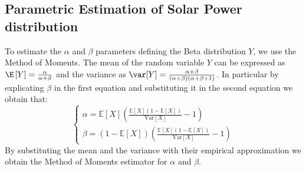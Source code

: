 {%



\subsection{Parametric Estimation of Solar Power distribution}\label{subsection: beta estim}

To estimate the \(\alpha\) and \(\beta\) parameters defining the Beta distribution \(Y\), we use the Method of Moments.
The mean of the random variable \(Y\) can be expressed as \(\E\left[ Y\right] = \frac{\alpha}{\alpha + \beta} \) and the variance as \(\var [Y]= \frac{\alpha + \beta}{(\alpha + \beta)(\alpha + \beta + 1)}\). 
In particular by explicating \(\beta\) in the first equation and substituting it in the second equation we obtain that:
\begin{equation}
\begin{cases}
\alpha = \mathbb{E}[X] \left( \frac{\mathbb{E}[X](1 - \mathbb{E}[X])}{\mathrm{Var}[X]} - 1 \right) \\
\beta = (1 - \mathbb{E}[X]) \left( \frac{\mathbb{E}[X](1 - \mathbb{E}[X])}{\mathrm{Var}[X]} - 1 \right)
\end{cases}
\end{equation}
By substituting the mean and the variance with their empirical approximation we obtain the Method of Moments estimator for \(\alpha\) and \(\beta\).






}
